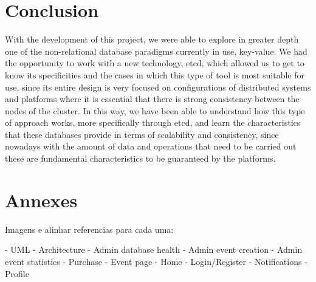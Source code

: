 \documentclass[screen,review]{acmart}
\begin{document}
\section{Conclusion}
With the development of this project, we were able to explore in greater depth one of the non-relational database paradigms currently in use, key-value. We had the opportunity to work with a new technology, etcd, which allowed us to get to know its specificities and the cases in which this type of tool is most suitable for use, since its entire design is very focused on configurations of distributed systems and platforms where it is essential that there is strong consistency between the nodes of the cluster.
In this way, we have been able to understand how this type of approach works, more specifically through etcd, and learn the characteristics that these databases provide in terms of scalability and consistency, since nowadays with the amount of data and operations that need to be carried out these are fundamental characteristics to be guaranteed by the platforms.

\section{Annexes}

Imagens e alinhar referencias para cada uma:

- UML
- Architecture
- Admin database health
- Admin event creation
- Admin event statistics
- Purchase
- Event page
- Home
- Login/Register
- Notifications
- Profile


\nocite{*}
\def\BibTex{BibTeX}


\end{document}
